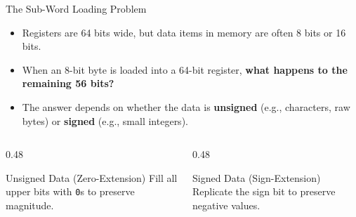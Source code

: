 \documentclass[aspectratio=169,11pt,t]{beamer}
\newcommand{\key}[1]{\textbf{#1}}
\newcommand{\bits}[1]{\texttt{#1}}
\begin{document}
\begin{frame}{The Sub-Word Loading Problem}
\large
\begin{itemize}\setlength{\itemsep}{7pt}
  \item Registers are 64 bits wide, but data items in memory are often 8 bits or 16 bits.
  \item When an 8-bit byte is loaded into a 64-bit register, \key{what happens to the remaining 56 bits?}
  \item The answer depends on whether the data is \key{unsigned} (e.g., characters, raw bytes) or \key{signed} (e.g., small integers).
\end{itemize}

\vspace{0.3cm}
\begin{columns}[T,onlytextwidth]
\begin{column}{0.48\textwidth}
\begin{block}{Unsigned Data (Zero-Extension)}
Fill all upper bits with \bits{0}s to preserve magnitude.
\end{block}
\end{column}

\begin{column}{0.48\textwidth}
\begin{block}{Signed Data (Sign-Extension)}
Replicate the sign bit to preserve negative values.
\end{block}
\end{column}
\end{columns}
\end{frame}

\end{document}
